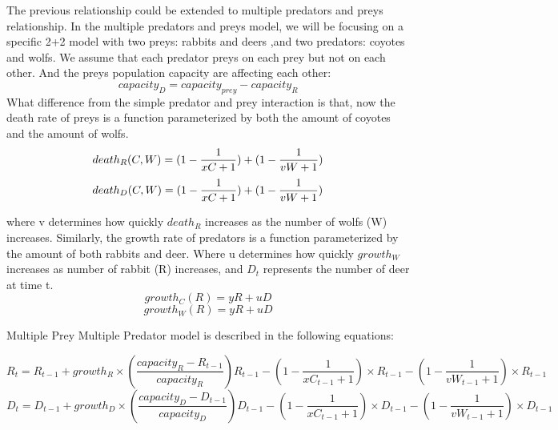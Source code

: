 \documentclass{article}
\begin{document}
\begin{normalsize}
		The previous relationship could be extended to multiple predators and preys relationship. In the multiple predators and preys model, we will be focusing on a specific 2+2 model with two preys: rabbits and deers ,and two predators: coyotes and wolfs. We assume that each predator preys on each prey but not on each other. And the preys population capacity are affecting each other:
		\begin{equation}
		    capacity_{D} = capacity_{prey} - capacity_{R}
		\end{equation}
		What difference from the simple predator and prey interaction is that, now the death rate of preys is a function parameterized by both the amount of coyotes and the amount of wolfs. 
		\begin{equation}
		    death_R(C,W) = (1 - \frac{1}{xC + 1}) + (1 - \frac{1}{vW + 1})\\
		\end{equation}
		\begin{equation}
		    death_D(C,W) = (1 - \frac{1}{xC + 1}) + (1 - \frac{1}{vW + 1})\\
		\end{equation}
		
		where v determines how quickly $death_{R}$ increases as the number of wolfs (W) increases. 
		Similarly, the growth rate of predators is a function parameterized by the amount of both rabbits and deer.  Where u determines how quickly $growth_W$ increases as number of rabbit (R) increases, and $D_{t}$ represents the number of deer at time t.\\
		
		\begin{equation}
		growth_C(R) = yR+uD
		\end{equation}
		\begin{equation}
		growth_W(R) = yR+uD
		\end{equation}
		
		Multiple Prey Multiple Predator model is described in the following equations:
		
		\begin{equation}
		R_t = R_{t-1} + growth_{R} \times (\frac{capacity_R - R_{t-1}}{capacity_R})R_{t-1} - (1 - \frac{1}{xC_{t-1} + 1} ) \times R_{t-1}- (1 - \frac{1}{vW_{t-1} + 1})\times R_{t-1}
		\end{equation}
		\begin{equation}
		D_t = D_{t-1} + growth_{D} \times (\frac{capacity_D - D_{t-1}}{capacity_D})D_{t-1} - (1 - \frac{1}{xC_{t-1} + 1} )\times D_{t-1}- (1 - \frac{1}{vW_{t-1} + 1})\times D_{t-1}
		\end{equation}


\end{normalsize}
\end{document}
